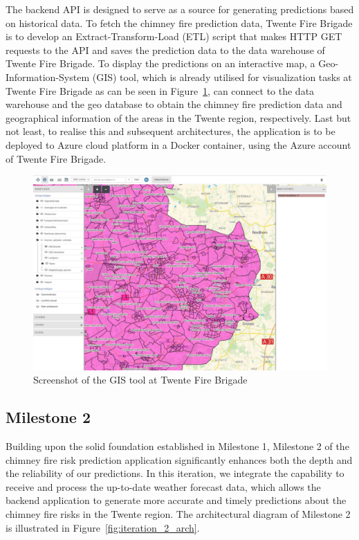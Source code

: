 \documentclass{utitcphd_overleaf}
\begin{document}
The backend API is designed to serve as a source for generating predictions based on historical data. To fetch the chimney fire prediction data, Twente Fire Brigade is to develop an Extract-Transform-Load (ETL) script that makes HTTP GET requests to the API and saves the prediction data to the data warehouse of Twente Fire Brigade. To display the predictions on an interactive map, a Geo-Information-System (GIS) tool, which is already utilised for visualization tasks at Twente Fire Brigade as can be seen in Figure~\ref{fig:iteration_1_gis}, can connect to the data warehouse and the geo database to obtain the chimney fire prediction data and geographical information of the areas in the Twente region, respectively. Last but not least, to realise this and subsequent architectures, the application is to be deployed to Azure cloud platform in a Docker container, using the Azure account of Twente Fire Brigade.

\begin{figure}[ht]
  \centering
  \includegraphics[width=1\textwidth]{my_images/milestones/iteration_1_gis.pdf}
  \caption{Screenshot of the GIS tool at Twente Fire Brigade}
  \label{fig:iteration_1_gis}
\end{figure}

\subsection{Milestone 2}

Building upon the solid foundation established in Milestone 1, Milestone 2 of the chimney fire risk prediction application significantly enhances both the depth and the reliability of our predictions. In this iteration, we integrate the capability to receive and process the up-to-date weather forecast data, which allows the backend application to generate more accurate and timely predictions about the chimney fire risks in the Twente region. The architectural diagram of Milestone 2 is illustrated in Figure~\ref{fig:iteration_2_arch}.
\end{document}
